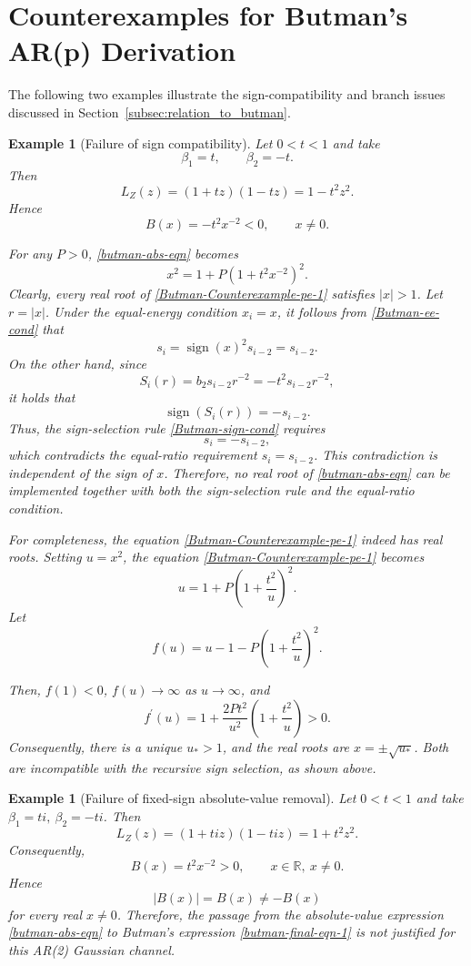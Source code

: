 \documentclass[12pt]{article}
\newtheorem{example}[thm]{Example}
\begin{document}
\section{Counterexamples for Butman's AR(p) Derivation}\label{sec:example_of_ar_2_gaussian_channel}
The following two examples illustrate the sign-compatibility and branch issues discussed in Section~\ref{subsec:relation_to_butman}.
\begin{example}[Failure of sign compatibility]\label{Butman-example-1:label}
Let $0<t<1$ and take
\[
    \beta_1=t,\qquad \beta_2=-t.
\]
Then
\[
    L_Z(z)=(1+tz)(1-tz)=1-t^2z^2.
\]
Hence
$$
    B(x)=-t^2x^{-2}<0,\qquad x\neq0 .
$$

For any \(P>0\), \eqref{butman-abs-eqn} becomes
\begin{equation}\label{Butman-Counterexample-pe-1}
    x^2 = 1+P\left(1+t^2x^{-2}\right)^2.
\end{equation}
Clearly, every real root of \eqref{Butman-Counterexample-pe-1} satisfies $|x|>1$. Let $r=|x|$. Under the equal-energy condition $x_i=x$, it follows from \eqref{Butman-ee-cond} that
\[
    s_i=\operatorname{sign}(x)^2s_{i-2}=s_{i-2}.
\]
On the other hand, since
\[
    S_i(r)=b_2s_{i-2}r^{-2}=-t^2s_{i-2}r^{-2},
\]
it holds that
\[
    \operatorname{sign}(S_i(r))=-s_{i-2}.
\]
Thus, the sign-selection rule \eqref{Butman-sign-cond} requires
\[
    s_i=-s_{i-2},
\]
which contradicts the equal-ratio requirement \(s_i=s_{i-2}\). This contradiction is independent of the sign of $x$. Therefore, no real root of \eqref{butman-abs-eqn} can be implemented together with both the sign-selection rule and the equal-ratio condition.

For completeness, the equation \eqref{Butman-Counterexample-pe-1} indeed has real roots. Setting \(u=x^2\), the equation \eqref{Butman-Counterexample-pe-1} becomes
\[
    u=1+P\left(1+\frac{t^2}{u}\right)^2 .
\]
Let
\[
    f(u)=u-1-P\left(1+\frac{t^2}{u}\right)^2.
\]

Then, \(f(1)<0\), \(f(u)\to\infty\) as \(u\to\infty\), and
\[
    f^\prime(u) = 1+\frac{2Pt^2}{u^2}\left(1+\frac{t^2}{u}\right)>0 .
\]
Consequently, there is a unique \(u_\ast>1\), and the real roots are \(x=\pm\sqrt{u_\ast}\). Both are incompatible with the recursive sign selection, as shown above.
\end{example}

\begin{example}[Failure of fixed-sign absolute-value removal]
\label{Butman-example-2:label}
Let \(0<t<1\) and take $ \beta_1=ti,~\beta_2=-ti$.
Then
$$
    L_Z(z)=(1+tiz)(1-tiz)=1+t^2z^2.
$$
Consequently,
$$
    B(x)=t^2x^{-2}>0,\qquad x\in\mathbb R,\ x\neq0 .
$$
Hence
\[
    |B(x)|=B(x)\neq -B(x)
\]
for every real \(x\neq0\). Therefore, the passage from the absolute-value expression \eqref{butman-abs-eqn} to Butman's expression \eqref{butman-final-eqn-1} is not justified for this AR(2) Gaussian channel.
\end{example}
\end{document}
